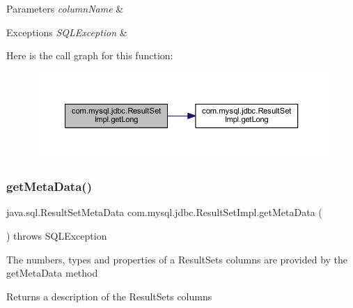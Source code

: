 \begin{DoxyParams}{Parameters}
{\em column\+Name} & \\
\hline
\end{DoxyParams}

\begin{DoxyExceptions}{Exceptions}
{\em S\+Q\+L\+Exception} & \\
\hline
\end{DoxyExceptions}
Here is the call graph for this function\+:
\nopagebreak
\begin{figure}[H]
\begin{center}
\leavevmode
\includegraphics[width=350pt]{classcom_1_1mysql_1_1jdbc_1_1_result_set_impl_aeb04e9c6a16658943e9da23b0e5a7ccd_cgraph}
\end{center}
\end{figure}
\mbox{\label{classcom_1_1mysql_1_1jdbc_1_1_result_set_impl_adf8449b6f578c8e424326ec7a25a6b97}} 
\subsubsection{\texorpdfstring{get\+Meta\+Data()}{getMetaData()}}
{\footnotesize\ttfamily java.\+sql.\+Result\+Set\+Meta\+Data com.\+mysql.\+jdbc.\+Result\+Set\+Impl.\+get\+Meta\+Data (\begin{DoxyParamCaption}{ }\end{DoxyParamCaption}) throws S\+Q\+L\+Exception}

The numbers, types and properties of a Result\+Set\textquotesingle{}s columns are provided by the get\+Meta\+Data method

\begin{DoxyReturn}{Returns}
a description of the Result\+Set\textquotesingle{}s columns
\end{DoxyReturn}

